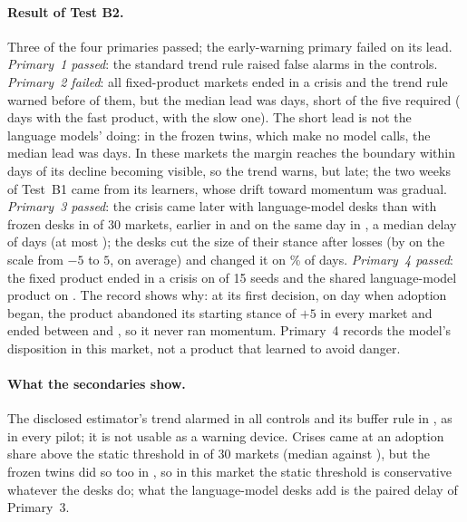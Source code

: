 \paragraph{Result of Test B2.} Three of the four primaries passed; the early-warning primary failed on its lead. \emph{Primary~1 passed}: the standard trend rule raised \BtwoFA{} false alarms in the \BtwoControl{} controls. \emph{Primary~2 failed}: all \BtwoRamp{} fixed-product markets ended in a crisis and the trend rule warned before \BtwoEarly{} of them, but the median lead was \BtwoLead{} days, short of the five required (\BtwoLeadFast{} days with the fast product, \BtwoLeadSlow{} with the slow one). The short lead is not the language models' doing: in the frozen twins, which make no model calls, the median lead was \BtwoTwinLead{} days. In these markets the margin reaches the boundary within days of its decline becoming visible, so the trend warns, but late; the two weeks of Test~B1 came from its learners, whose drift toward momentum was gradual. \emph{Primary~3 passed}: the crisis came later with language-model desks than with frozen desks in \BtwoLater{} of 30 markets, earlier in \BtwoEarlier{} and on the same day in \BtwoTies{}, a median delay of \BtwoDelay{} days (at most \BtwoMaxDelay{}); the desks cut the size of their stance after losses (by \BtwoLossCut{} on the scale from $-5$ to $5$, on average) and changed it on \BtwoChangeRate\% of days. \emph{Primary~4 passed}: the fixed product ended in a crisis on \BtwoCrisesFast{} of 15 seeds and the shared language-model product on \BtwoCrisesLLMV{}. The record shows why: at its first decision, on day \BtwoSwitchMin{} when adoption began, the product abandoned its starting stance of $+5$ in every market and ended between \BtwoFinalMin{} and \BtwoFinalMax{}, so it never ran momentum. Primary~4 records the model's disposition in this market, not a product that learned to avoid danger.

\paragraph{What the secondaries show.} The disclosed estimator's trend alarmed in all \BtwoDiscTtzFA{} controls and its buffer rule in \BtwoDiscFA{}, as in every pilot; it is not usable as a warning device. Crises came at an adoption share above the static threshold in \BtwoAbove{} of 30 markets (median \BtwoShare{} against \BtwoStatic{}), but the frozen twins did so too in \BtwoTwinsAbove{}, so in this market the static threshold is conservative whatever the desks do; what the language-model desks add is the paired delay of Primary~3.

